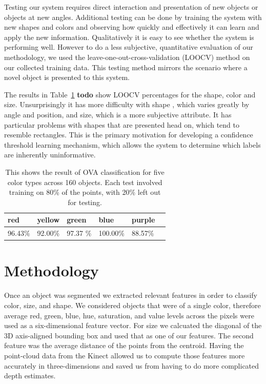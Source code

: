 \documentclass[11pt]{article}
\newcommand{\xxx}[1]{{\bf \color{red} #1}}
\newcommand\T{\rule{0pt}{3ex}}
\newcommand\B{\rule[-1.2ex]{0pt}{0pt}}
\begin{document}
Testing our system requires direct interaction and presentation of new objects
or objects at new angles.  Additional testing can be done by training the
system with new shapes and colors and observing how quickly and effectively it
can learn and apply the new information.  Qualitatively it is easy to see
whether the system is performing well.  However to do a less subjective,
quantitative evaluation of our methodology, we used the leave-one-out-cross-validation
(LOOCV) method on our collected training data.  This testing method mirrors the
scenario where a novel object is presented to this system.

The results in Table~\ref{tbl:testresults} \xxx{todo} show LOOCV percentages
for the shape, color and size.  Unsurprisingly it has more difficulty with shape
, which varies greatly by angle and position, and size, which is a more
subjective attribute. It has particular problems with shapes that are presented
head on, which tend to resemble rectangles.  This is the primary motivation for
developing a confidence threshold learning mechanism, which allows the system
to determine which labels are inherently uninformative.


\begin{table}
\centering
\begin{tabular}{ | l | l | l | l | l | l |}
    \hline
    red &  yellow & green & blue & purple \T \B \\ \hline
    96.43\%  & 92.00\% & 97.37 \% & 100.00\% & 88.57\% \B \T \\ \hline
\end{tabular}
\caption{This shows the result of OVA classification for five color types
    across 160 objects. Each test involved training on 80\% of the points,
           with 20\% left out for testing.}
\label{tbl:testresults}
\end{table}

\section{Methodology}

Once an object was segmented we extracted relevant features in order to classify color, size, and shape. We considered objects that were of a single color, therefore average red, green, blue, hue, saturation, and value levels across the pixels were used as a six-dimensional feature vector. For size we calcuated the diagonal of the 3D axis-aligned bounding box and used that as one of our features. The second feature was the average distance of the points from the centroid. Having the point-cloud data from the Kinect allowed us to compute those features more accurately in three-dimensions and saved us from having to do more complicated depth estimates.
\end{document}
